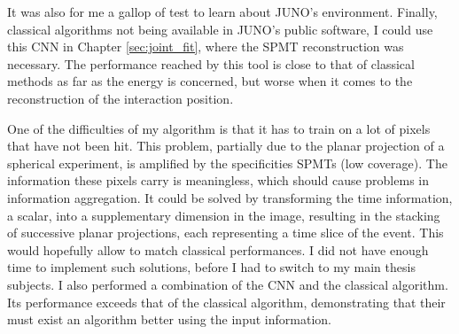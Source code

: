\documentclass[../main.tex]{subfiles}
\begin{document}
It was also for me a gallop of test to learn about JUNO's environment. Finally, classical algorithms not being available in JUNO's public software, I could use this CNN in Chapter \ref{sec:joint_fit}, where the SPMT reconstruction was necessary. The performance reached by this tool is close to that of classical methods as far as the energy is concerned, but worse when it comes to the reconstruction of the interaction position.

One of the difficulties of my algorithm is that it has to train on a lot of pixels that have not been hit. This problem, partially due to the planar projection of a spherical experiment, is amplified by the specificities SPMTs (low coverage). The information these pixels carry is meaningless, which should cause problems in information aggregation. It could be solved by transforming the time information, a scalar, into a supplementary dimension in the image, resulting in the stacking of successive planar projections, each representing a time slice of the event. This would hopefully allow to match classical performances. I did not have enough time to implement such solutions, before I had to switch to my main thesis subjects. I also performed a combination of the CNN and the classical algorithm. Its performance exceeds that of the classical algorithm, demonstrating that their must exist an algorithm better using the input information.

\hfill
\end{document}
